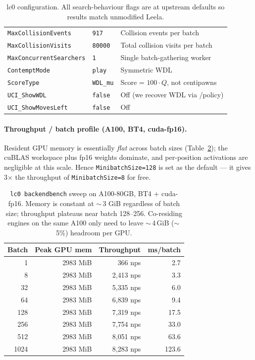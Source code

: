 \begin{table}[h]
\begin{tabular}{llll}
\texttt{MaxCollisionEvents}     & \texttt{917}     & \multicolumn{2}{l}{Collision events per batch} \\
\texttt{MaxCollisionVisits}     & \texttt{80000}   & \multicolumn{2}{l}{Total collision visits per batch} \\
\texttt{MaxConcurrentSearchers} & \texttt{1}       & \multicolumn{2}{l}{Single batch-gathering worker} \\
\texttt{ContemptMode}           & \texttt{play}    & \multicolumn{2}{l}{Symmetric WDL} \\
\texttt{ScoreType}              & \texttt{WDL\_mu} & \multicolumn{2}{l}{Score = $100\!\cdot\!Q$, not centipawns} \\
\texttt{UCI\_ShowWDL}           & \texttt{false}   & \multicolumn{2}{l}{Off (we recover WDL via /policy)} \\
\texttt{UCI\_ShowMovesLeft}     & \texttt{false}   & \multicolumn{2}{l}{Off} \\
\bottomrule
\end{tabular}
\caption{lc0 configuration. All search-behaviour flags are at upstream defaults so results match unmodified Leela.}
\label{tab:lc0-flags}
\end{table}

\paragraph{Throughput / batch profile (A100, BT4, cuda-fp16).}
Resident GPU memory is essentially \emph{flat} across batch sizes (Table~\ref{tab:lc0-bench}); the cuBLAS workspace plus fp16 weights dominate, and per-position activations are negligible at this scale. Hence \texttt{MinibatchSize=128} is set as the default --- it gives 3$\times$ the throughput of \texttt{MinibatchSize=8} for free.

\begin{table}[h]
\centering
\small
\begin{tabular}{rrrr}
\toprule
\textbf{Batch} & \textbf{Peak GPU mem} & \textbf{Throughput} & \textbf{ms/batch} \\
\midrule
1    & 2983 MiB & 366 nps    & 2.7   \\
8    & 2983 MiB & 2{,}413 nps   & 3.3   \\
32   & 2983 MiB & 5{,}335 nps   & 6.0   \\
64   & 2983 MiB & 6{,}839 nps   & 9.4   \\
128  & 2983 MiB & 7{,}319 nps   & 17.5  \\
256  & 2983 MiB & 7{,}754 nps   & 33.0  \\
512  & 2983 MiB & 8{,}051 nps   & 63.6  \\
1024 & 2983 MiB & 8{,}283 nps   & 123.6 \\
\bottomrule
\end{tabular}
\caption{\texttt{lc0 backendbench} sweep on A100-80GB, BT4 + cuda-fp16. Memory is constant at $\sim$\,3 GiB regardless of batch size; throughput plateaus near batch 128--256. Co-residing engines on the same A100 only need to leave $\sim$\,4\,GiB ($\sim$\,5\%) headroom per GPU.}
\label{tab:lc0-bench}
\end{table}

